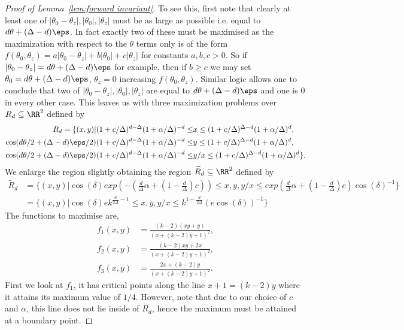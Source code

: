 \begin{proof}[Proof of Lemma~\ref{lem:forward invariant}]
To see this, first note that clearly at least one of $|\theta_0 - \theta_z|, |\theta_0|, |\theta_z|$ must be as large as possible i.e. equal to $d\theta +(\Delta-d)\eps$.
In fact exactly two of these must be maximised as the maximization with respect to the $\theta$ terms only is of the form $f(\theta_0,\theta_z)=a|\theta_0 - \theta_z|+b|\theta_0| +c|\theta_z|$ for constants $a,b,c>0$.
So if $|\theta_0 - \theta_z| = d\theta +(\Delta-d)\eps$ for example, then if $b\geq c$ we may set $\theta_0=d\theta +(\Delta-d)\eps$, $\theta_z=0$ increasing $f(\theta_0,\theta_z)$.
Similar logic allows one to conclude that two of $|\theta_0 - \theta_z|, |\theta_0|, |\theta_z|$ are equal to $d\theta +(\Delta-d)\eps$ and one is $0$ in every other case.
%
This leaves us with three maximization problems over $R_d \subseteq \RR^2$ defined by 
\begin{align*}
 R_d = \{(x,y) |  (1+c/\Delta)^{d-\Delta}(1+\alpha/\Delta)^{-d} \leq & x \leq(1+c/\Delta)^{\Delta-d}(1+\alpha/\Delta)^{d} , \\
  \cos(d\theta/2+(\Delta-d)\eps/2)(1+c/\Delta)^{d-\Delta}(1+\alpha/\Delta)^{-d} \leq & y \leq (1+c/\Delta)^{\Delta-d}(1+\alpha/\Delta)^{d}, \\
  \cos(d\theta/2+(\Delta-d)\eps/2)(1+c/\Delta)^{d-\Delta}(1+\alpha/\Delta)^{-d} \leq & y/x\leq (1+c/\Delta)^{\Delta-d}(1+\alpha/\Delta)^{d}\}.
\end{align*}
We enlarge the region slightly obtaining the region $\widetilde{R}_d \subseteq \RR^2$ defined by
\begin{align*}
 \widetilde{R}_d & = \{(x,y) | \cos(\delta)exp(-(\frac{d}{\Delta} \alpha + (1-\frac{d}{\Delta})c)) \leq x, y, y/x \leq  exp(\frac{d}{\Delta} \alpha + (1-\frac{d}{\Delta})c)\cos(\delta)^{-1}\} \\
 & = \{(x,y) | \cos(\delta)e k^{\frac{d}{2\Delta}-1} \leq x, y, y/x \leq  k^{1-\frac{d}{2\Delta}}(e\cos(\delta))^{-1} \}
\end{align*}
The functions to maximise are,
\begin{align*}
 f_1(x,y) & =\frac{(k-2)(xy+y)}{(x+(k-2)y+1)^2}, \\
 f_2(x,y) & =\frac{(k-2)xy+2x}{(x+(k-2)y+1)^2}, \\
 f_3(x,y) & =\frac{2x+(k-2)y}{(x+(k-2)y+1)^2}.
\end{align*}
%
%
First we look at $f_1$, it has critical points along the line $x+1=(k-2)y$ where it attains its maximum value of $1/4$.
However, note that due to our choice of $c$ and $\alpha$, this line does not lie inside of $\widetilde{R_d}$, hence the maximum must be attained at a boundary point.

\end{proof}
